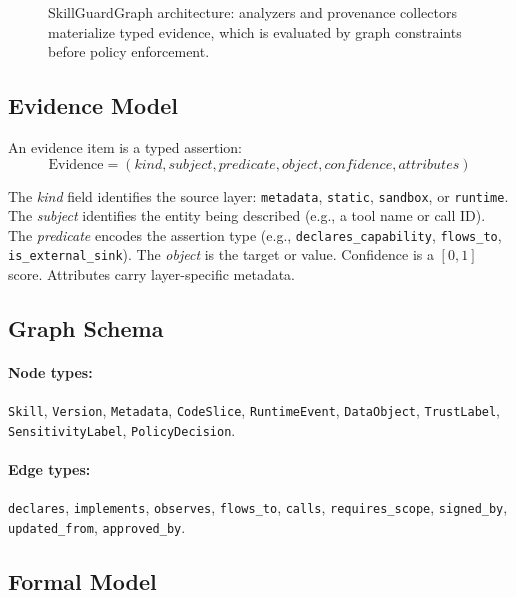 \documentclass[10pt]{article}
\begin{document}
\begin{figure}[t]
\centering

\caption{SkillGuardGraph architecture: analyzers and provenance collectors materialize typed evidence, which is evaluated by graph constraints before policy enforcement.}
\label{fig:system_architecture}
\end{figure}

\subsection{Evidence Model}

An evidence item is a typed assertion:
\begin{equation}
\text{Evidence} = (\textit{kind}, \textit{subject}, \textit{predicate}, \textit{object}, \textit{confidence}, \textit{attributes})
\end{equation}

The \textit{kind} field identifies the source layer: \texttt{metadata}, \texttt{static}, \texttt{sandbox}, or \texttt{runtime}. The \textit{subject} identifies the entity being described (e.g., a tool name or call ID). The \textit{predicate} encodes the assertion type (e.g., \texttt{declares\_capability}, \texttt{flows\_to}, \texttt{is\_external\_sink}). The \textit{object} is the target or value. Confidence is a $[0,1]$ score. Attributes carry layer-specific metadata.

\subsection{Graph Schema}

\paragraph{Node types:}
\texttt{Skill}, \texttt{Version}, \texttt{Metadata}, \texttt{CodeSlice}, \texttt{RuntimeEvent}, \texttt{DataObject}, \texttt{TrustLabel}, \texttt{SensitivityLabel}, \texttt{PolicyDecision}.

\paragraph{Edge types:}
\texttt{declares}, \texttt{implements}, \texttt{observes}, \texttt{flows\_to}, \texttt{calls}, \texttt{requires\_scope}, \texttt{signed\_by}, \texttt{updated\_from}, \texttt{approved\_by}.

\subsection{Formal Model}
\end{document}
